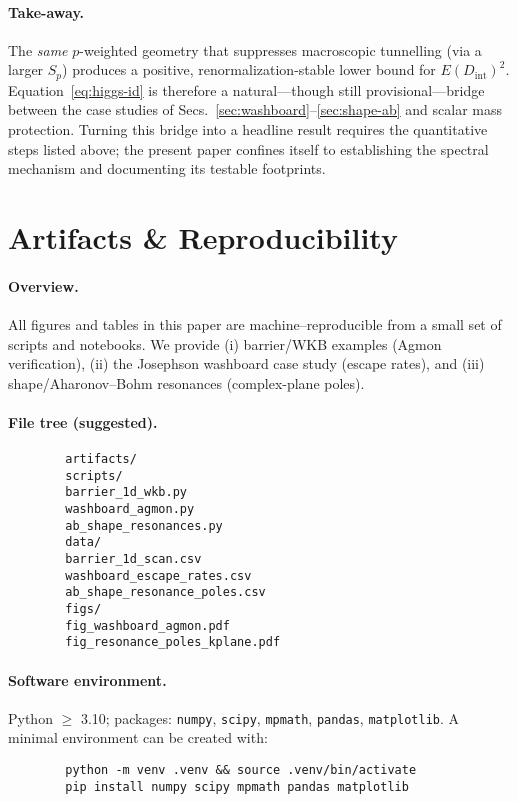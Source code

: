 \documentclass[11pt]{article}
\theoremstyle{definition}
\begin{document}
    \paragraph{Take-away.}
    The \emph{same} $p$-weighted geometry that suppresses macroscopic tunnelling (via a larger $S_p$) produces a positive, renormalization-stable lower bound for $E(D_{\mathrm{int}})^2$.
    Equation~\eqref{eq:higgs-id} is therefore a natural---though still provisional---bridge between the case studies of Secs.~\ref{sec:washboard}--\ref{sec:shape-ab} and scalar mass protection. 
    Turning this bridge into a headline result requires the quantitative steps listed above; the present paper confines itself to establishing the spectral mechanism and documenting its testable footprints.
    
    
    \section{Artifacts \& Reproducibility}
    \label{sec:artifacts}
    
    \paragraph{Overview.}
    All figures and tables in this paper are machine–reproducible from a small set of scripts and notebooks. 
    We provide (i) barrier/WKB examples (Agmon verification), (ii) the Josephson washboard case study (escape rates), and (iii) shape/Aharonov--Bohm resonances (complex-plane poles).
    
    \paragraph{File tree (suggested).}
    \begin{verbatim}
    	artifacts/
    	scripts/
    	barrier_1d_wkb.py
    	washboard_agmon.py
    	ab_shape_resonances.py
    	data/
    	barrier_1d_scan.csv
    	washboard_escape_rates.csv
    	ab_shape_resonance_poles.csv
    	figs/
    	fig_washboard_agmon.pdf
    	fig_resonance_poles_kplane.pdf
    \end{verbatim}
    
    \paragraph{Software environment.}
    Python $\ge$ 3.10; packages: \texttt{numpy}, \texttt{scipy}, \texttt{mpmath}, \texttt{pandas}, \texttt{matplotlib}.
    A minimal environment can be created with:
    \begin{verbatim}
    	python -m venv .venv && source .venv/bin/activate
    	pip install numpy scipy mpmath pandas matplotlib
    \end{verbatim}
    
\end{document}
